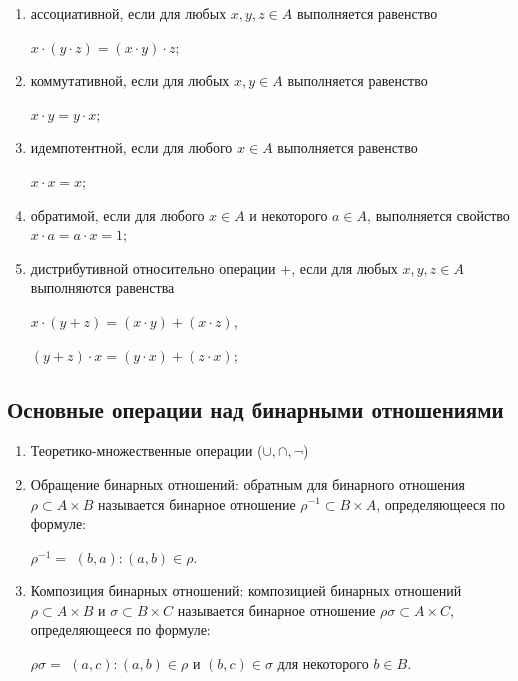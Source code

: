 \documentclass[spec, och, labwork]{shiza}
\begin{document}
    \begin{enumerate}
        \item ассоциативной, если для любых $x, y, z \in A$ выполняется равенство
        
        \begin{center}
            $x \cdot (y \cdot z) = (x \cdot y) \cdot z$;
        \end{center}

        \item коммутативной, если для любых $x, y \in A$ выполняется равенство
        
        \begin{center}
            $x \cdot y = y \cdot x$;
        \end{center}

        \item идемпотентной, если для любого $x \in A$ выполняется равенство
        
        \begin{center}
            $x \cdot x = x$;
        \end{center}

        \item обратимой, если для любого $x \in A$ и некоторого $a \in A$, выполняется свойство $x \cdot a = a \cdot x = 1$;
        \item дистрибутивной относительно операции +, если для любых $x, y, z \in A$ выполняются равенства
        
        \begin{center}
            $x \cdot (y + z) = (x \cdot y) + (x \cdot z)$,

            $(y + z) \cdot x = (y \cdot x) + (z \cdot x)$;
        \end{center}
    \end{enumerate}

    \subsection{Основные операции над бинарными отношениями}

    \begin{enumerate}
        \item Теоретико-множественные операции ($\cup, \cap, \neg$)
        \item Обращение бинарных отношений: обратным для бинарного отношения $\rho \subset A \times B$ называется бинарное
        отношение $\rho^{-1} \subset B \times A$, определяющееся по формуле:
        \begin{center}
            $\rho^{-1} = $ {$(b, a) : (a, b) \in \rho$}.
        \end{center}
        \item Композиция бинарных отношений: композицией бинарных отношений $\rho \subset A \times B$ и $\sigma \subset B \times C$
        называется бинарное отношение $\rho\sigma \subset A \times C$, определяющееся по формуле:
        \begin{center}
            $\rho\sigma = $ {$(a, c) : (a, b) \in \rho \text{ и } (b, c) \in \sigma \text{ для некоторого } b \in B$}.
        \end{center}
    \end{enumerate}
\end{document}
